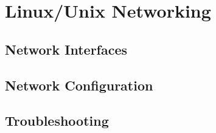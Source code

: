 \chapter{Linux/Unix Networking}

\section{Network Interfaces}

\section{Network Configuration}

\section{Troubleshooting}
